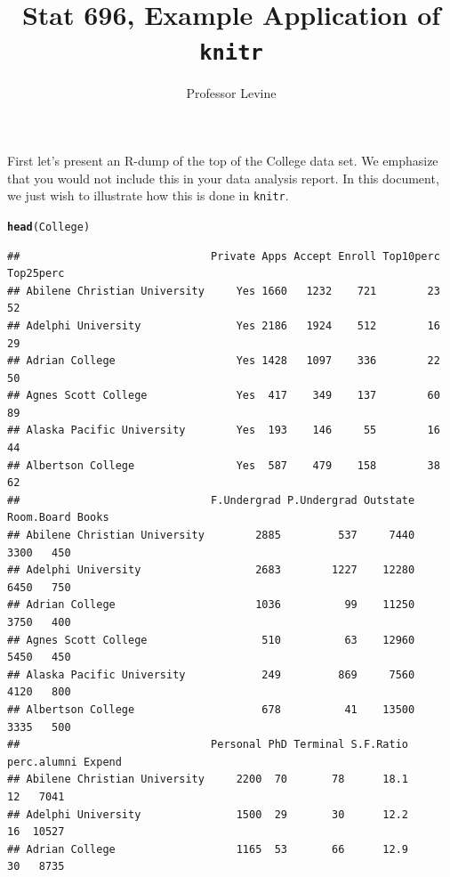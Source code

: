\documentclass{article}\usepackage[]{graphicx}\usepackage[]{color}
\title{Stat 696, Example Application of \texttt{knitr}}
\author{Professor Levine}
\makeatletter
\newcommand{\hlstd}[1]{\textcolor[rgb]{0.345,0.345,0.345}{#1}}%
\newcommand{\hlkwd}[1]{\textcolor[rgb]{0.737,0.353,0.396}{\textbf{#1}}}%
\newenvironment{kframe}{%
 \def\at@end@of@kframe{}%
 \ifinner\ifhmode%
  \def\at@end@of@kframe{\end{minipage}}%
  \begin{minipage}{\columnwidth}%
 \fi\fi%
 \def\FrameCommand##1{\hskip\@totalleftmargin \hskip-\fboxsep
 \colorbox{shadecolor}{##1}\hskip-\fboxsep
     \hskip-\linewidth \hskip-\@totalleftmargin \hskip\columnwidth}%
 \MakeFramed {\advance\hsize-\width
   \@totalleftmargin\z@ \linewidth\hsize
   \@setminipage}}%
 {\par\unskip\endMakeFramed%
 \at@end@of@kframe}
\newenvironment{knitrout}{}{} %
\makeatother
\begin{document}
 
\maketitle





First let's present an R-dump of the top of the College data set.  We emphasize that you would not include this in your data analysis report.  In this document, we just wish to illustrate how this is done in \texttt{knitr}.
\begin{knitrout}
\color{fgcolor}\begin{kframe}
\begin{alltt}
\hlkwd{head}\hlstd{(College)}
\end{alltt}
\begin{verbatim}
##                              Private Apps Accept Enroll Top10perc Top25perc
## Abilene Christian University     Yes 1660   1232    721        23        52
## Adelphi University               Yes 2186   1924    512        16        29
## Adrian College                   Yes 1428   1097    336        22        50
## Agnes Scott College              Yes  417    349    137        60        89
## Alaska Pacific University        Yes  193    146     55        16        44
## Albertson College                Yes  587    479    158        38        62
##                              F.Undergrad P.Undergrad Outstate Room.Board Books
## Abilene Christian University        2885         537     7440       3300   450
## Adelphi University                  2683        1227    12280       6450   750
## Adrian College                      1036          99    11250       3750   400
## Agnes Scott College                  510          63    12960       5450   450
## Alaska Pacific University            249         869     7560       4120   800
## Albertson College                    678          41    13500       3335   500
##                              Personal PhD Terminal S.F.Ratio perc.alumni Expend
## Abilene Christian University     2200  70       78      18.1          12   7041
## Adelphi University               1500  29       30      12.2          16  10527
## Adrian College                   1165  53       66      12.9          30   8735

\end{verbatim}
\end{kframe}
\end{knitrout}
\end{document}
